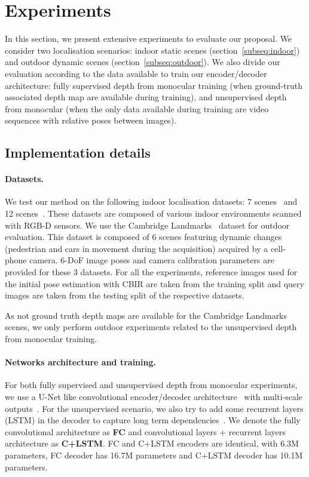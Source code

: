 \section{Experiments}
\label{seq:results}

In this section, we present extensive experiments to evaluate our proposal. We consider two localisation scenarios: indoor static scenes (section~\ref{subseq:indoor}) and outdoor dynamic scenes (section~\ref{subseq:outdoor}). We also divide our evaluation according to the data available to train our encoder/decoder architecture: fully supervised depth from monocular training (when ground-truth associated depth map are available during training), and unsupervised depth from monocular (when the only data available during training are video sequences with relative poses between images).

\subsection{Implementation details}
\label{subseq:implementation}

\paragraph{Datasets.} We test our method on the following indoor localisation datasets: 7 scenes~\citep{Shotton2013} and 12 scenes~\citep{Valentin2016}. These datasets are composed of various indoor environments scanned with RGB-D sensors. We use the Cambridge Landmarks~\citep{Kendall2015} dataset for outdoor evaluation. This dataset is composed of 6 scenes featuring dynamic changes (pedestrian and cars in movement during the acquisition) acquired by a cell-phone camera. 6-DoF image poses and camera calibration parameters are provided for these 3 datasets. For all the experiments, reference images used for the initial pose estimation with CBIR are taken from the training split and query images are taken from the testing split of the respective datasets.

As not ground truth depth maps are available for the Cambridge Landmarks scenes, we only perform outdoor experiments related to the unsupervised depth from monocular training.

\paragraph{Networks architecture and training.} For both fully supervised and unsupervised depth from monocular experiments, we use a U-Net like convolutional encoder/decoder architecture~\citep{Isola2017} with multi-scale outputs~\citep{Godard2017}. For the unsupervised scenario, we also try to add some recurrent layers (LSTM) in the decoder to capture long term dependencies~\citep{Visin2015, Li2016b}. We denote the fully convolutional architecture as \textbf{FC} and convolutional layers + recurrent layers architecture as \textbf{C+LSTM}. FC and C+LSTM encoders are identical, with 6.3M parameters, FC decoder has 16.7M parameters and C+LSTM decoder has 10.1M parameters.

